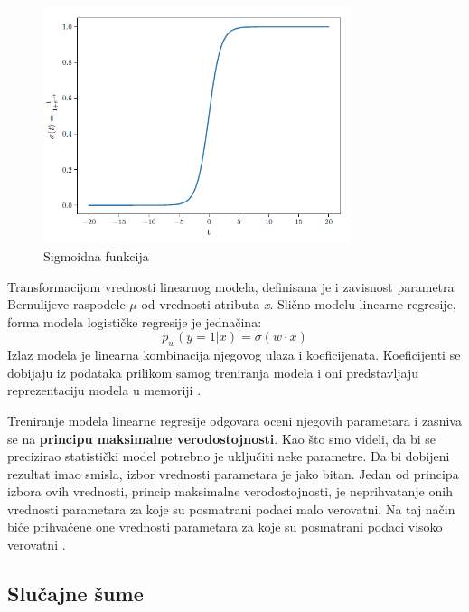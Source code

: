 \documentclass[12pt,oneside]{memoir}
\begin{document}
\begin{figure}[!ht]
  \centering
  \includegraphics[width=0.8\textwidth]{sigma.png}
  \caption{Sigmoidna funkcija}
  \label{fig:sigmagraph}
\end{figure}

Transformacijom vrednosti linearnog modela, definisana je i zavisnost parametra Bernulijeve raspodele $\mu$ od vrednosti atributa \textit{x}. Slično modelu linearne regresije, forma modela logističke regresije je jednačina: $$  p_w (y=1|x) = \sigma(w \cdot x) $$Izlaz modela je linearna kombinacija njegovog ulaza i koeficijenata. Koeficijenti se dobijaju iz podataka prilikom samog treniranja modela i oni predstavljaju reprezentaciju modela u memoriji \cite{mladen, mlm}.

Treniranje modela linearne regresije odgovara oceni njegovih parametara i zasniva se na \textbf{principu maksimalne verodostojnosti}. Kao što smo videli, da bi se precizirao statistički model potrebno je uključiti neke parametre. Da bi dobijeni rezultat imao smisla, izbor vrednosti parametara je jako bitan. Jedan od principa izbora ovih vrednosti, princip maksimalne verodostojnosti, je neprihvatanje onih vrednosti parametara za koje su posmatrani podaci malo verovatni. Na taj način biće prihvaćene one vrednosti parametara za koje su posmatrani podaci visoko verovatni \cite{mladen}.

\subsection{Slučajne šume}
\end{document}
